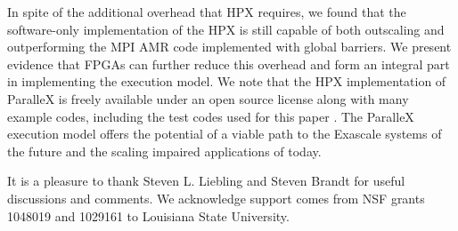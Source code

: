 \documentclass{revtex4}
\begin{document}
  In spite of the additional overhead that HPX requires, we found that the software-only 
implementation of the HPX is still capable of both outscaling and outperforming 
the MPI AMR code implemented with global barriers.  We present evidence that FPGAs can further reduce
this overhead and form an integral part in implementing the execution model.
We note that the HPX implementation of ParalleX is freely available under an open source license
along with many example codes, including the test codes used for this paper \cite{tutorial}.
The ParalleX execution model offers the potential of a viable path to the Exascale systems of the future and 
the scaling impaired applications of today.

It is a pleasure to thank Steven L. Liebling and Steven Brandt for useful discussions and comments.  We
acknowledge support comes from NSF grants 1048019 and 1029161 to Louisiana State University.

\nocite{*}



\end{document}
